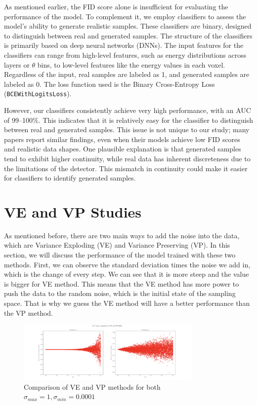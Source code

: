 As mentioned earlier, the FID score alone is insufficient for evaluating the performance of the model. To complement it, we employ classifiers to assess the model's ability to generate realistic samples. These classifiers are binary, designed to distinguish between real and generated samples. The structure of the classifiers is primarily based on deep neural networks (DNNs). The input features for the classifiers can range from high-level features, such as energy distributions across layers or $\theta$ bins, to low-level features like the energy values in each voxel. Regardless of the input, real samples are labeled as 1, and generated samples are labeled as 0. The loss function used is the Binary Cross-Entropy Loss (\texttt{BCEWithLogitsLoss}).

However, our classifiers consistently achieve very high performance, with an AUC of 99--100\%. This indicates that it is relatively easy for the classifier to distinguish between real and generated samples. This issue is not unique to our study; many papers report similar findings, even when their models achieve low FID scores and realistic data shapes. One plausible explanation is that generated samples tend to exhibit higher continuity, while real data has inherent discreteness due to the limitations of the detector. This mismatch in continuity could make it easier for classifiers to identify generated samples.


\section{VE and VP Studies}
As mentioned before, there are two main ways to add the noise into the data, which are Variance Exploding (VE) and Variance Preserving (VP). In this section, we will discuss the performance of the model trained with these two methods. First, we can observe the standard deviation times the noise we add in, which is the change of every step. We can see that it is more steep and the value is bigger for VE method. This means that the VE method has more power to push the data to the random noise, which is the initial state of the sampling space. That is why we guess the VE method will have a better performance than the VP method.

\begin{figure}[h!]
    \centering
    \includegraphics[width=0.8\textwidth,height= 0.35\textwidth]{Figures/sde1.png}
    \caption{Comparison of VE and VP methods for both $\sigma_{max} = 1, \sigma_{min} = 0.0001$} \label{fig:sde1}
\end{figure}

